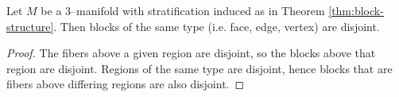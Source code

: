 \begin{lem}
	Let $M$ be a 3--manifold with stratification induced as in Theorem \ref{thm:block-structure}.
	Then blocks of the same type (i.e. face, edge, vertex) are disjoint.
\end{lem}

\begin{proof}
	The fibers above a given region are disjoint, so the blocks above that region are disjoint.
	Regions of the same type are disjoint, hence blocks that are fibers above differing regions are also disjoint.
\end{proof}


